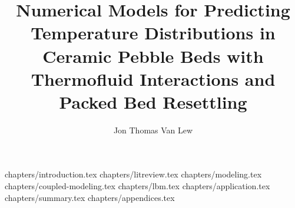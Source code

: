 \documentclass [PhD] {uclathes}
\title      {Numerical Models for Predicting Temperature Distributions in Ceramic Pebble Beds with Thermofluid Interactions and Packed Bed Resettling}
\author     {Jon Thomas Van Lew}
\begin{document}
\makeintropages
		{chapters/introduction.tex}
		{chapters/litreview.tex}
		{chapters/modeling.tex}
		{chapters/coupled-modeling.tex}
		{chapters/lbm.tex}
		{chapters/application.tex}
		{chapters/summary.tex}
		{chapters/appendices.tex}


\end{document}

